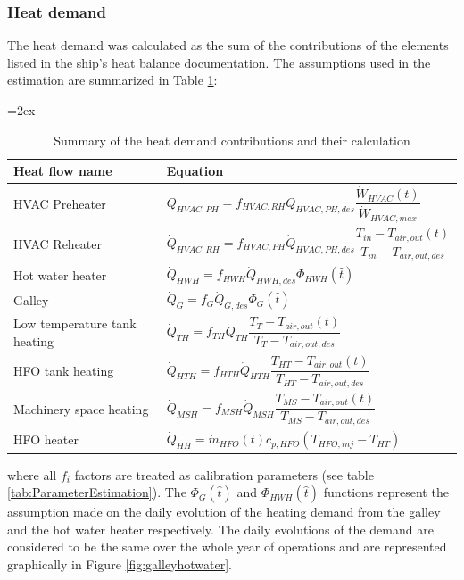 \documentclass[preprint,12pt]{elsarticle}
\begin{document}
	
	
\subsubsection{Heat demand}
	
The heat demand was calculated as the sum of the contributions of the elements listed in the ship's heat balance documentation. The assumptions used in the estimation are summarized in Table \ref{tab:HeatDemand}:
\begin{table}
	\centering
	{\tablinesep=2ex\tabcolsep=10pt
		\begin{tabular}{p{2.8cm}l}
			\hline 
			Heat flow name & Equation \\
			\hline
			HVAC Preheater & $\dot{Q}_{HVAC,PH} = f_{HVAC,RH} \dot{Q}_{HVAC,PH,des} \dfrac{\dot{W}_{HVAC}(t)}{\dot{W}_{HVAC,max}} $ \\
			HVAC Reheater &	$\dot{Q}_{HVAC,RH} = f_{HVAC,PH} \dot{Q}_{HVAC,PH,des} \dfrac{T_{in} - T_{air,out}(t)}{T_{in} - T_{air,out,des}}$ \\
			Hot water heater& $\dot{Q}_{HWH} = f_{HWH} \dot{Q}_{HWH,des} \Phi_{HWH}(\hat{t})$ \\
			Galley & $\dot{Q}_{G} = f_{G} \dot{Q}_{G,des} \Phi_G(\hat{t})$ \\
			Low temperature tank heating & $\dot{Q}_{TH} = f_{TH} \dot{Q}_{TH} \dfrac{T_{T} - T_{air,out}(t)}{T_{T} -T_{air,out,des}}$ \\
			HFO tank heating & $\dot{Q}_{HTH} = f_{HTH} \dot{Q}_{HTH} \dfrac{T_{HT} - T_{air,out}(t)}{T_{HT} - T_{air,out,des}}$ \\
			Machinery space heating & $\dot{Q}_{MSH} = f_{MSH} \dot{Q}_{MSH} \dfrac{T_{MS} - T_{air,out}(t)}{T_{MS} - T_{air,out,des}}$ \\
			HFO heater & $\dot{Q}_{HH} = \dot{m}_{HFO}(t) c_{p,HFO} (T_{HFO,inj} - T_{HT})$ \\
			\hline
	\end{tabular}}
	\caption{Summary of the heat demand contributions and their calculation}
	\label{tab:HeatDemand}
\end{table}
	
where all $f_i$ factors are treated as calibration parameters (see table \ref{tab:ParameterEstimation}). The $\Phi_G(\hat{t})$ and $\Phi_{HWH}(\hat{t})$ functions represent the assumption made on the daily evolution of the heating demand from the galley and the hot water heater respectively. The daily evolutions of the demand are considered to be the same over the whole year of operations and are represented graphically in Figure \ref{fig:galleyhotwater}.
	
\end{document}
